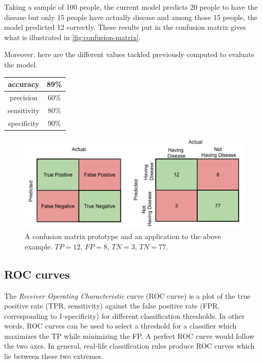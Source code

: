 \documentclass[11pt, openany]{report}
\theoremstyle{plain}
\theoremstyle{definition}
\theoremstyle{remark}
\begin{document}
Taking a sample of 100 people, the current model predicts 20 people to have the disease but only 15 people have actually disease and among those 15 people, the model predicted 12 correctly. These results put in the confusion matrix gives what is illustrated in \autoref{fig:confusion-matrix}. 

Moreover, here are the different values tackled previously computed to evaluate the model. 

\begin{center}
    \begin{tabular}{|c|c|}
      \hline 
      accuracy & 89\% \\
      \hline
      precision & 60\% \\
      \hline
      sensitivity & 80\% \\
      \hline
      specificity &  90\% \\
      \hline
    \end{tabular}
\end{center}

\begin{figure}[h]
  \centering
  \includegraphics[scale=0.4]{figures/confusion-matrix.png}
  \caption{A confusion matrix prototype and an application to the above example. $TP = 12$, $FP = 8$, $TN = 3$, $TN = 77$.}
  \label{fig:confusion-matrix}
\end{figure}


\subsection{ROC curves}
The \textit{Receiver Operating Characteristic} curve (ROC curve) is a plot of the true positive rate (TPR, sensitivity) against the false positive rate (FPR, corresponding to 1-specificity) for different classification thresholds. In other words, ROC curves can be used to select a threshold for a classifier which maximizes the TP while minimizing the FP. A perfect ROC curve would follow the two axes. In general, real-life classification rules produce ROC curves which lie between these two extremes. 
\end{document}

